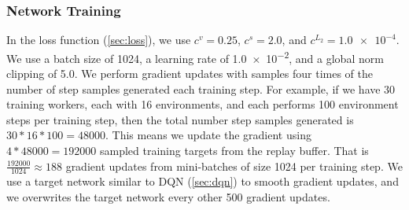 \subsubsection{Network Training}
In the loss function (\ref{sec:loss}), we use $c^v = 0.25$, $c^s = 2.0$, and $c^{L_2} = \num{1.0e-4}$.
We use a batch size of 1024, a learning rate of \num{1.0e-2}, and a global norm clipping of \num{5.0}.
We perform gradient updates with samples four times of the number of step samples generated each training step.
For example, if we have 30 training workers, each with 16 environments, and each performs 100 environment steps per training step, then the total number step samples generated is $30 * 16 * 100 = 48000$.
This means we update the gradient using $4 * 48000 = 192000$ sampled training targets from the replay buffer.
That is $\frac{192000}{1024} \approx 188$ gradient updates from mini-batches of size 1024 per training step.
We use a target network similar to DQN (\ref{sec:dqn}) to smooth gradient updates, and we overwrites the target network every other 500 gradient updates.

